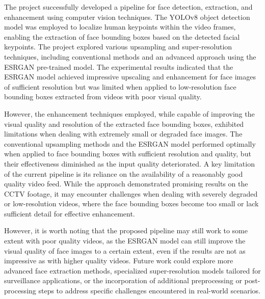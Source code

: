 The project successfully developed a pipeline for face detection, extraction, and enhancement using computer vision techniques. The YOLOv8 object detection model was employed to localize human keypoints within the video frames, enabling the extraction of face bounding boxes based on the detected facial keypoints. The project explored various upsampling and super-resolution techniques, including conventional methods and an advanced approach using the ESRGAN pre-trained model. The experimental results indicated that the ESRGAN model achieved impressive upscaling and enhancement for face images of sufficient resolution but was limited when applied to low-resolution face bounding boxes extracted from videos with poor visual quality.

However, the enhancement techniques employed, while capable of improving the visual quality and resolution of the extracted face bounding boxes, exhibited limitations when dealing with extremely small or degraded face images. The conventional upsampling methods and the ESRGAN model performed optimally when applied to face bounding boxes with sufficient resolution and quality, but their effectiveness diminished as the input quality deteriorated. A key limitation of the current pipeline is its reliance on the availability of a reasonably good quality video feed. While the approach demonstrated promising results on the CCTV footage, it may encounter challenges when dealing with severely degraded or low-resolution videos, where the face bounding boxes become too small or lack sufficient detail for effective enhancement.

However, it is worth noting that the proposed pipeline may still work to some extent with poor quality videos, as the ESRGAN model can still improve the visual quality of face images to a certain extent, even if the results are not as impressive as with higher quality videos. Future work could explore more advanced face extraction methods, specialized super-resolution models tailored for surveillance applications, or the incorporation of additional preprocessing or post-processing steps to address specific challenges encountered in real-world scenarios. 